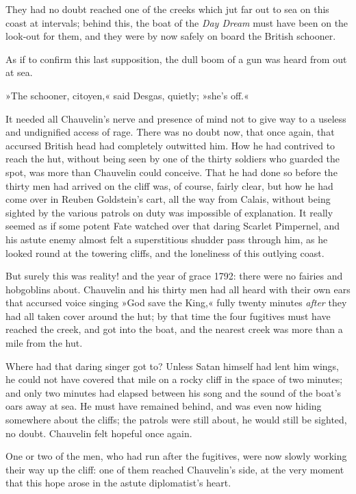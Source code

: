 They had no doubt reached one of the creeks which jut far out to sea on this coast at intervals; behind this, the boat of the \textit{Day Dream} must have been on the look-out for them, and they were by now safely on board the British schooner.

As if to confirm this last supposition, the dull boom of a gun was heard from out at sea.

»The schooner, citoyen,« said Desgas, quietly; »she's off.«

It needed all Chauvelin's nerve and presence of mind not to give way to a useless and undignified access of rage. There was no doubt now, that once again, that accursed British head had completely outwitted him. How he had contrived to reach the hut, without being seen by one of the thirty soldiers who guarded the spot, was more than Chauvelin could conceive. That he had done so before the thirty men had arrived on the cliff was, of course, fairly clear, but how he had come over in Reuben Goldstein's cart, all the way from Calais, without being sighted by the various patrols on duty was impossible of explanation. It really seemed as if some potent Fate watched over that daring Scarlet Pimpernel, and his astute enemy almost felt a superstitious shudder pass through him, as he looked round at the towering cliffs, and the loneliness of this outlying coast.

But surely this was reality! and the year of grace 1792: there were no fairies and hobgoblins about. Chauvelin and his thirty men had all heard with their own ears that accursed voice singing »God save the King,« fully twenty minutes \textit{after} they had all taken cover around the hut; by that time the four fugitives must have reached the creek, and got into the boat, and the nearest creek was more than a mile from the hut.

Where had that daring singer got to? Unless Satan himself had lent him wings, he could not have covered that mile on a rocky cliff in the space of two minutes; and only two minutes had elapsed between his song and the sound of the boat's oars away at sea. He must have remained behind, and was even now hiding somewhere about the cliffs; the patrols were still about, he would still be sighted, no doubt. Chauvelin felt hopeful once again.

One or two of the men, who had run after the fugitives, were now slowly working their way up the cliff: one of them reached Chauvelin's side, at the very moment that this hope arose in the astute diplomatist's heart.

